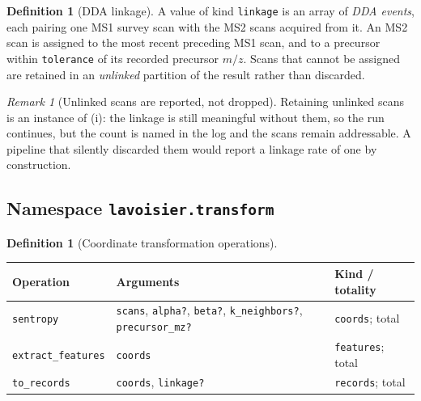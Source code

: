 \documentclass[11pt,twocolumn,a4paper]{article}
\theoremstyle{ssthm}
\theoremstyle{definition}
\newtheorem{definition}[theorem]{Definition}
\theoremstyle{remark}
\newtheorem{remark}[theorem]{Remark}
\newcommand{\shk}[1]{\texttt{#1}}
\begin{document}
\begin{definition}[DDA linkage]
\label{def:linkage}
A value of kind \shk{linkage} is an array of \emph{DDA events}, each
pairing one MS1 survey scan with the MS2 scans acquired from it. An MS2
scan is assigned to the most recent preceding MS1 scan, and to a
precursor within \shk{tolerance} of its recorded precursor $m/z$. Scans
that cannot be assigned are retained in an \emph{unlinked} partition of
the result rather than discarded.
\end{definition}

\begin{remark}[Unlinked scans are reported, not dropped]
\label{rem:unlinked}
Retaining unlinked scans is an instance of
(i): the linkage is still meaningful
without them, so the run continues, but the count is named in the log and
the scans remain addressable. A pipeline that silently discarded them
would report a linkage rate of one by construction.
\end{remark}

\subsection{Namespace \shk{lavoisier.transform}}

\begin{definition}[Coordinate transformation operations]
\label{def:transform-ops}
\hfill
\begin{longtable}{@{}p{}p{}p{}@{}}
\toprule
\textbf{Operation} & \textbf{Arguments} & \textbf{Kind / totality}\\
\midrule
\endhead
\shk{sentropy} &
\shk{scans}, \shk{alpha?}, \shk{beta?}, \shk{k\_neighbors?},
\shk{precursor\_mz?} &
\shk{coords}; total\\
\addlinespace
\shk{extract\_features} &
\shk{coords} &
\shk{features}; total\\
\addlinespace
\shk{to\_records} &
\shk{coords}, \shk{linkage?} &
\shk{records}; total\\
\bottomrule
\end{longtable}
\end{definition}
\end{document}
